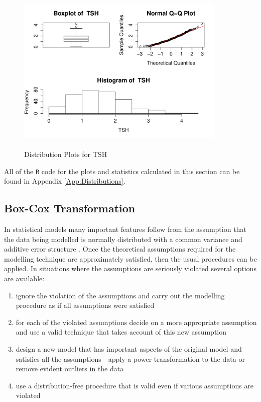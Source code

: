 \documentclass[12pt,a4paper]{report}
\begin{document}
\begin{figure}[ht]\centering
    \includegraphics[width=10cm, height=8cm]{NormTSH.pdf}
    \caption{Distribution Plots for TSH}
    \label{Distribution:TSH}
\end{figure}
\vspace{2mm}

All of the {\small\verb"R"} code for the plots and statistics calculated in this section can be found in Appendix \ref{App:Distributions}.

\subsection{Box-Cox Transformation}
In statistical models many important features follow from the assumption that the data being modelled is normally distributed with a common variance and additive error structure \citep{BoxCoxReview}. Once the theoretical assumptions required for the modelling technique are approximately satisfied, then the usual procedures can be applied. In situations where the assumptions are seriously violated several options are available:
\begin{enumerate}
    \item ignore the violation of the assumptions and carry out the modelling procedure as if all assumptions were satisfied
    \item for each of the violated assumptions decide on a more appropriate assumption and use a valid technique that takes account of this new assumption
    \item design a new model that has important aspects of the original model and satisfies all the assumptions - apply a power transformation to the data or remove evident outliers in the data
    \item use a distribution-free procedure that is valid even if various assumptions are violated
\end{enumerate}
\end{document}
